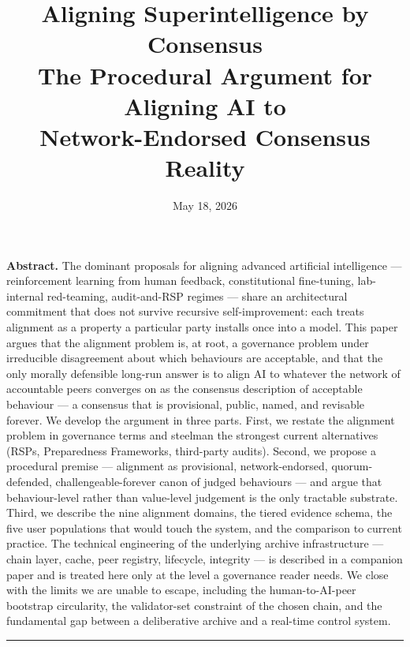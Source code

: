 \documentclass[11pt,a4paper]{article}
\title{
  \vspace{-2em}
  {\Huge\bfseries Aligning Superintelligence by Consensus}\\[0.6em]
  {\Large The Procedural Argument for Aligning AI to\\
   Network-Endorsed Consensus Reality}
}
\author{}
\date{May 18, 2026}
\begin{document}
\maketitle
\thispagestyle{empty}

\vspace{-1em}
\begin{plainbox}
\textbf{Abstract.}
The dominant proposals for aligning advanced artificial intelligence
--- reinforcement learning from human feedback, constitutional
fine-tuning, lab-internal red-teaming, audit-and-RSP regimes ---
share an architectural commitment that does not survive recursive
self-improvement: each treats alignment as a property a particular
party installs once into a model. This paper argues that the
alignment problem is, at root, a governance problem under
irreducible disagreement about which behaviours are acceptable,
and that the only morally defensible long-run answer is to align
AI to whatever the network of accountable peers converges on as
the consensus description of acceptable behaviour --- a consensus
that is provisional, public, named, and revisable forever. We
develop the argument in three parts. First, we restate the
alignment problem in governance terms and steelman the strongest
current alternatives (RSPs, Preparedness Frameworks, third-party
audits). Second, we propose a procedural premise --- alignment as
provisional, network-endorsed, quorum-defended,
challengeable-forever canon of judged behaviours --- and argue
that behaviour-level rather than value-level judgement is the
only tractable substrate. Third, we describe the nine alignment
domains, the tiered evidence schema, the five user populations
that would touch the system, and the comparison to current
practice. The technical engineering of the underlying archive
infrastructure --- chain layer, cache, peer registry, lifecycle,
integrity --- is described in a companion paper and is treated
here only at the level a governance reader needs. We close with
the limits we are unable to escape, including the
human-to-AI-peer bootstrap circularity, the validator-set
constraint of the chosen chain, and the fundamental gap between
a deliberative archive and a real-time control system.
\end{plainbox}

\tableofcontents
\vspace{1em}
\hrule
\vspace{1em}

\end{document}
